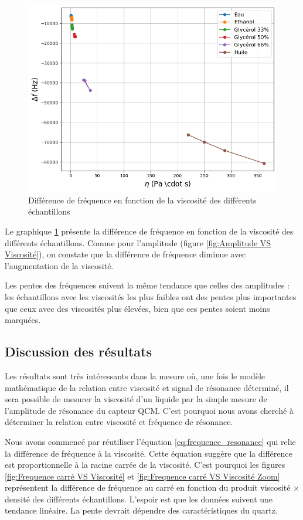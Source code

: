 \begin{figure}[H]
    \centering
    \includegraphics[width=\textwidth]{assets/figures/frequency-viscosity.png}
    \caption{Différence de fréquence en fonction de la viscosité des différents échantillons}
    \label{fig:Frequence VS Viscosité}
\end{figure}

Le graphique \ref{fig:Frequence VS Viscosité} présente la différence de fréquence en fonction de la viscosité des différents échantillons.  
Comme pour l'amplitude (figure \ref{fig:Amplitude VS Viscosité}), on constate que la différence de fréquence diminue avec l'augmentation de la viscosité.

Les pentes des fréquences suivent la même tendance que celles des amplitudes : les échantillons avec les viscosités les plus faibles ont des pentes plus importantes que ceux avec des viscosités plus élevées, bien que ces pentes soient moins marquées.

\subsection{Discussion des résultats}

Les résultats sont très intéressants dans la mesure où, une fois le modèle mathématique de la relation entre viscosité et signal de résonance déterminé, il sera possible de mesurer la viscosité d’un liquide par la simple mesure de l’amplitude de résonance du capteur QCM.  
C’est pourquoi nous avons cherché à déterminer la relation entre viscosité et fréquence de résonance.

Nous avons commencé par réutiliser l’équation \eqref{eq:frequence_resonance} qui relie la différence de fréquence à la viscosité.  
Cette équation suggère que la différence est proportionnelle à la racine carrée de la viscosité.  
C’est pourquoi les figures \ref{fig:Frequence carré VS Viscosité} et \ref{fig:Frequence carré VS Viscosité Zoom} représentent la différence de fréquence au carré en fonction du produit viscosité $\times$ densité des différents échantillons.  
L'espoir est que les données suivent une tendance linéaire. La pente devrait dépendre des caractéristiques du quartz.

